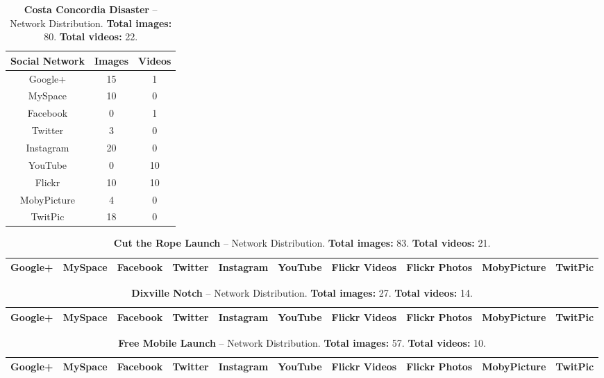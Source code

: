 \documentclass{acm_proc_article-sp}
\begin{document}
\begin{table}[htbp]
  \begin{tabular}{ | c | c | c | }
    \hline
    \textbf{Social Network} & \textbf{Images} & \textbf{Videos}\\
    \hline
    Google+ & 15 & 1\\
    MySpace & 10 & 0\\
    Facebook & 0 & 1\\
    Twitter & 3 & 0\\
    Instagram & 20 & 0\\
    YouTube & 0 & 10\\
    Flickr & 10 & 10\\
    MobyPicture & 4 & 0\\
    TwitPic & 18 & 0\\
    \hline
  \end{tabular}
  \label{tab:concordia}
  \caption{\textbf{Costa Concordia Disaster} -- Network Distribution. \textbf{Total images:} 80. \textbf{Total videos:} 22.}
\end{table}


\begin{table}[htbp]
  \begin{tabular}{ | c | c | c | c | c | c | c | c | c | c | }
    \hline
    Google+ & MySpace & Facebook & Twitter & Instagram & YouTube & Flickr Videos & Flickr Photos & MobyPicture & TwitPic\\
    \hline

    \hline
  \end{tabular}
  \label{tab:assad}
  \caption{\textbf{Cut the Rope Launch} -- Network Distribution. \textbf{Total images:} 83. \textbf{Total videos:} 21.}
\end{table}

\begin{table}[htbp]
  \begin{tabular}{ | c | c | c | c | c | c | c | c | c | c | }
    \hline
    Google+ & MySpace & Facebook & Twitter & Instagram & YouTube & Flickr Videos & Flickr Photos & MobyPicture & TwitPic\\
    \hline

    \hline
  \end{tabular}
  \label{tab:assad}
  \caption{\textbf{Dixville Notch} -- Network Distribution. \textbf{Total images:} 27. \textbf{Total videos:} 14.}
\end{table}

\begin{table}[htbp]
  \begin{tabular}{ | c | c | c | c | c | c | c | c | c | c | }
    \hline
    Google+ & MySpace & Facebook & Twitter & Instagram & YouTube & Flickr Videos & Flickr Photos & MobyPicture & TwitPic\\
    \hline

    \hline
  \end{tabular}
  \label{tab:assad}
  \caption{\textbf{Free Mobile Launch} -- Network Distribution. \textbf{Total images:} 57. \textbf{Total videos:} 10.}
\end{table}
\end{document}
